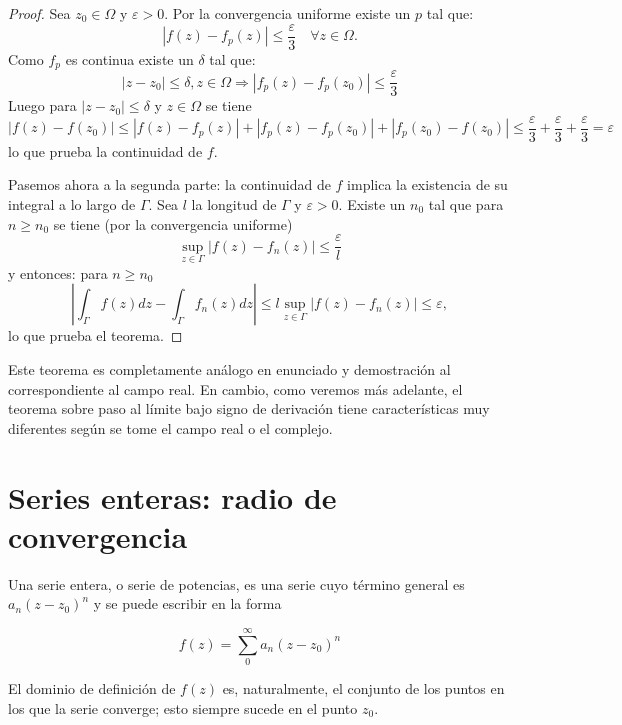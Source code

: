 \documentclass[10pt]{article}
\theoremstyle{plain}
\theoremstyle{definition}
\theoremstyle{remark}
\begin{document}
\begin{proof}
Sea $z_{0} \in \Omega$ y $\varepsilon>0$. Por la convergencia uniforme existe un $p$ tal que:
$$\left|f(z)-f_{p}(z)\right| \leqslant \frac{\varepsilon}{3} \quad \forall z \in \Omega .$$
Como $f_{p}$ es continua existe un $\delta$ tal que:
$$\left|z-z_{0}\right| \leqslant \delta, z \in \Omega \Rightarrow\left|f_{p}(z)-f_{p}\left(z_{0}\right)\right| \leqslant \frac{\varepsilon}{3}$$
Luego para $\left|z-z_{0}\right| \leqslant \delta$ y $z \in \Omega$ se tiene
$$\left|f(z)-f\left(z_{0}\right)\right| \leqslant\left|f(z)-f_{p}(z)\right|+\left|f_{p}(z)-f_{p}\left(z_{0}\right)\right|+\left|f_{p}\left(z_{0}\right)-f\left(z_{0}\right)\right| \leqslant \frac{\varepsilon}{3}+\frac{\varepsilon}{3}+\frac{\varepsilon}{3}=\varepsilon$$
lo que prueba la continuidad de $f$.

Pasemos ahora a la segunda parte: la continuidad de $f$ implica la existencia de su integral a lo largo de $\Gamma$.
Sea $l$ la longitud de $\Gamma$ y $\varepsilon>0$.
Existe un $n_{0}$ tal que para $n \geqslant n_{0}$ se tiene (por la convergencia uniforme)
$$\sup _{z \in \Gamma}\left|f(z)-f_{n}(z)\right| \leqslant \frac{\varepsilon}{l}$$
y entonces: para $n \geqslant n_{0}$
$$\left|\int_{\Gamma} f(z) d z-\int_{\Gamma} f_{n}(z) d z\right| \leqslant l \sup _{z \in \Gamma}\left|f(z)-f_{n}(z)\right| \leqslant \varepsilon,$$
lo que prueba el teorema.
\end{proof}

Este teorema es completamente análogo en enunciado y demostración al correspondiente al campo real. En cambio, como veremos más adelante, el teorema sobre paso al límite bajo signo de derivación tiene características muy diferentes según se tome el campo real o el complejo.

\section{Series enteras: radio de convergencia}
Una serie entera, o serie de potencias, es una serie cuyo término general es $a_{n}\left(z-z_{0}\right)^{n}$ y se puede escribir en la forma


\begin{equation*}
f(z)=\sum_{0}^{\infty} a_{n}\left(z-z_{0}\right)^{n} \tag{9-1}
\end{equation*}


El dominio de definición de $f(z)$ es, naturalmente, el conjunto de los puntos en los que la serie converge; esto siempre sucede en el punto $z_{0}$.
\end{document}
